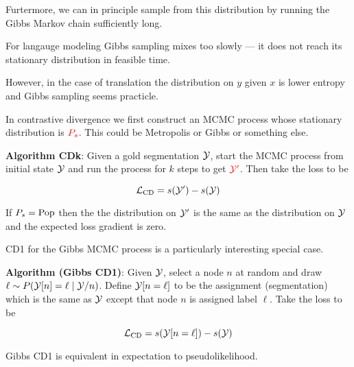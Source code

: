 {\vfill
Furtermore, we can in principle sample from this distribution by running the Gibbs Markov chain sufficiently long.


For langauge modeling Gibbs sampling mixes too slowly --- it does not reach its stationary distribution in feasible time.

\vfill
However, in the case of translation the distribution on $y$ given $x$ is lower entropy and Gibbs sampling seems practicle.

}




In contrastive divergence we first construct an MCMC process whose stationary distribution is ${\color{red} P_s}$.  This could be
Metropolis or Gibbs or something else.

\vfill
{\bf Algorithm CDk}: Given a gold segmentation ${\cal Y}$, start the MCMC process from initial state ${\cal Y}$ and run the process for $k$ steps
to get ${\color{red} {\cal Y}'}$.  Then take the loss to be

\vfill
{\color{red} $${\cal L}_{\mathrm{CD}}  = s({\cal Y}') - s({\cal Y})$$}

If $P_s = \mathrm{Pop}$ then the the distribution on ${\cal Y}'$ is the same as the distribution on ${\cal Y}$ and the
expected loss gradient is zero.


CD1 for the Gibbs MCMC process is a particularly interesting special case.

\vfill
{\bf Algorithm (Gibbs CD1)}: Given ${\cal Y}$, select a node $n$ at random and draw {\color{red} $\ell \sim P({\cal Y}[n]=\ell\;| \;{\cal Y}/n)$}. Define {\color{red} ${\cal Y}[n=\ell]$}
to be the assignment (segmentation) which is the same as ${\cal Y}$ except that node $n$ is assigned label $\ell$.  Take the loss to be

\vfill
{\color{red} $${\cal L}_{\mathrm{CD}}  = s({\cal Y}[n=\ell]) - s({\cal Y})$$}


Gibbs CD1 is equivalent in expectation to pseudolikelihood.

